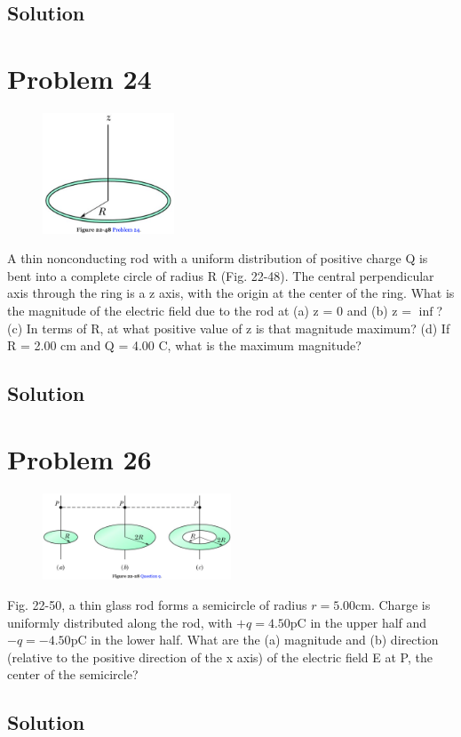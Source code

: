 \documentclass[12pt]{article}
\begin{document}
\subsection*{Solution}


\pagebreak
\section{Problem 24}
\begin{figure}
    \vspace{-30pt}
    \includegraphics[width=0.35\textwidth]{picture_5.png} 
\end{figure}
A thin nonconducting rod with a uniform distribution of positive charge Q is bent into a complete circle of radius R (Fig. 22-48). The central perpendicular axis through the ring is a z axis, with the origin at the center of the ring. What is the magnitude of the electric field due to the rod at (a) z = 0 and (b) z = $\inf$? (c) In terms of R, at what positive value of z is that magnitude maximum? (d) If R = 2.00 cm and Q = 4.00 C, what is the maximum magnitude?

\subsection*{Solution}


\pagebreak
\section{Problem 26}
\begin{figure}
    \vspace{-30pt}
    \includegraphics[width=0.5\textwidth]{picture_3.png} 
\end{figure}
Fig. 22-50, a thin glass rod forms a semicircle of radius $r = 5.00 \unit{\centi\meter}$. Charge is uniformly distributed along the rod, with $+q = 4.50 \unit{\pico\coulomb}$ in the upper half and $-q = -4.50 \unit{\pico\coulomb}$ in the lower half. What are the (a) magnitude and (b) direction (relative to the positive direction of the x axis) of the electric field E at P, the center of the semicircle?

\subsection*{Solution}
\end{document}
